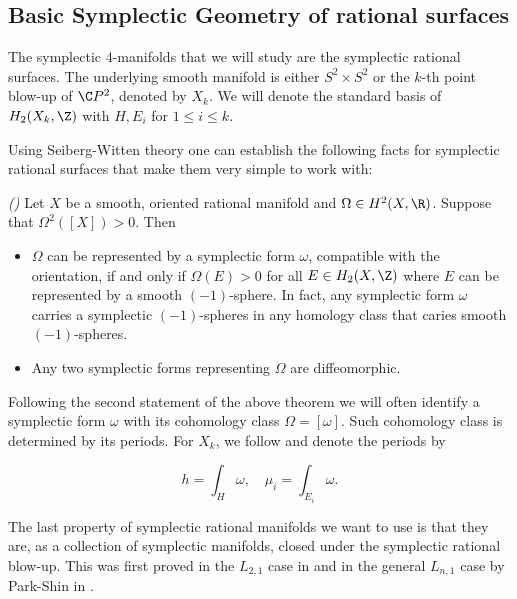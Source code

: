 \subsection{Basic Symplectic Geometry of rational surfaces}\label{basicsympgeometry}



The symplectic $4$-manifolds that we will study are the symplectic rational surfaces. The underlying smooth manifold is either $S^2\times S^2$ or the $k$-th point blow-up of $\C P^2$, denoted by $X_k$. We will denote the standard basis of $H_2(X_k,\Z)$ with $H,E_i$ for $1\leq i\leq k$.\par 

Using Seiberg-Witten theory one can establish the following facts for symplectic rational surfaces that make them very simple to work with:

\begin{Theorem}\emph{(\cite{li2008space})}\label{basicsymptoprational}
Let $X$ be a smooth, oriented rational manifold and $\Omega\in H^2(X,\R)$. Suppose that $\Omega^2([X])>0$.  Then
\begin{itemize}
    \item $\Omega$ can be represented by a symplectic form $\omega$, compatible with the orientation, if and only if $\Omega(E)>0$ for all $E\in H_2(X,\Z)$ where $E$ can be represented by a smooth $(-1)$-sphere. In fact, any symplectic form $\omega$ carries a symplectic $(-1)$-spheres in any homology class that caries smooth $(-1)$-spheres.
    
    \item Any two symplectic forms representing $\Omega$ are diffeomorphic.
\end{itemize}

\end{Theorem}

\begin{remark}\label{basicremark}
Following the second statement of the above theorem we will often identify a symplectic form $\omega$ with its cohomology class $\Omega=[\omega]$. Such cohomology class is determined by its periods. For $X_k$, we follow \cite{SS}  and denote the periods by 

\[h=\int_H\omega,\quad \mu_i=\int_{E_i}\omega.\]
\end{remark}

The last property of symplectic rational manifolds we want to use is that they are, as a collection of symplectic manifolds, closed under the symplectic rational blow-up. This was first proved in the $L_{2,1}$ case in \cite{BLW} and in the general $L_{n,1}$ case by Park-Shin in \cite{ParkShin}.

